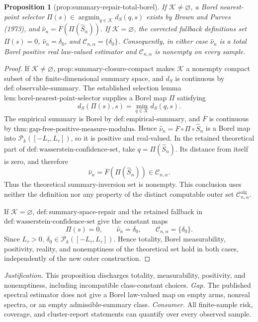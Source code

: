 \documentclass{article}
\newtheorem{proposition}{Proposition}
\begin{document}
\begin{proposition}[prop:summary-repair-total-borel]\label{prop:summary-repair-total-borel}
If \(\mathcal K\ne\varnothing\), a Borel nearest-point selector \(\Pi(s)\in\operatorname*{argmin}_{q\in\mathcal K}d_S(q,s)\) exists by Brown and Purves (1973), and \(\widehat\nu_n=\overline F(\Pi(\widehat S_n))\). If \(\mathcal K=\varnothing\), the corrected fallback definitions set \(\Pi(s)=0\), \(\widehat\nu_n=\delta_0\), and \(\mathcal C_{n,\alpha}=\{\delta_0\}\). Consequently, in either case \(\widehat\nu_n\) is a total Borel positive real law-valued estimator and \(\mathcal C_{n,\alpha}\) is nonempty on every sample.
\end{proposition}
\begin{proof}
If \(\mathcal K\ne\varnothing\), \(\mathrm{prop:summary\text{-}closure\text{-}compact}\) makes \(\mathcal K\) a nonempty compact subset of the finite-dimensional summary space, and \(d_S\) is continuous by \(\mathrm{def:observable\text{-}summary}\).  The established selection lemma \(\mathrm{lem:borel\text{-}nearest\text{-}point\text{-}selector}\) supplies a Borel map \(\Pi\) satisfying
\[
d_S(\Pi(s),s)=\min_{q\in\mathcal K}d_S(q,s).                         \tag{31}
\]
The empirical summary is Borel by \(\mathrm{def:empirical\text{-}summary}\), and \(\overline F\) is continuous by \(\mathrm{thm:gap\text{-}free\text{-}positive\text{-}measure\text{-}modulus}\).  Hence \(\widehat\nu_n=\overline F\circ\Pi\circ\widehat S_n\) is a Borel map into \(\mathcal P_k([-L_{\tau},L_{\tau}])\), so it is positive and real-valued.  In the retained theoretical part of \(\mathrm{def:wasserstein\text{-}confidence\text{-}set}\), take \(q=\Pi(\widehat S_n)\).  Its distance from itself is zero, and therefore
\[
\widehat\nu_n=\overline F(\Pi(\widehat S_n))\in\mathcal C_{n,\alpha}.
\]
Thus the theoretical summary-inversion set is nonempty.  This conclusion uses neither the definition nor any property of the distinct computable outer set \(\mathcal C^{\mathrm{alg}}_{n,\alpha}\).

If \(\mathcal K=\varnothing\), \(\mathrm{def:summary\text{-}space\text{-}repair}\) and the retained fallback in \(\mathrm{def:wasserstein\text{-}confidence\text{-}set}\) give the constant maps
\[
\Pi(s)=0,\qquad \widehat\nu_n=\delta_0,
\qquad \mathcal C_{n,\alpha}=\{\delta_0\}.
\]
Since \(L_{\tau}>0\), \(\delta_0\in\mathcal P_k([-L_{\tau},L_{\tau}])\).  Hence totality, Borel measurability, positivity, reality, and nonemptiness of the theoretical set hold in both cases, independently of the new outer construction.
\end{proof}
\par\smallskip\noindent \textit{Justification.} This proposition discharges totality, measurability, positivity, and nonemptiness, including incompatible class-constant choices. \textit{Gap.} The published spectral estimator does not give a Borel law-valued map on empty arms, nonreal spectra, or an empty admissible-summary class. \textit{Consumer.} All finite-sample risk, coverage, and cluster-report statements can quantify over every observed sample.
\end{document}
